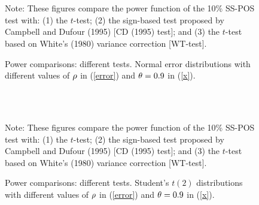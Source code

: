 \documentclass[harvard,11pt]{article}
\begin{document}
\begin{figure}[tbph]
\caption{Power comparisons: different tests. Normal error distributions with
different values of $\protect\rho $ in (\protect\ref{error}) and $\protect%
\theta =0.9$ in (\protect\ref{x}).}
\begin{center}
 \\[0pt]
\\[0pt]
\end{center}

Note: These figures compare the power
function of the 10\% SS-POS test with: (1) the $t$-test; (2) the sign-based test
proposed by Campbell and Dufour (1995) [CD (1995) test]; and (3) the $t$-test based
on White's (1980) variance correction [WT-test]. 
\label{fig: Power comparison using different tests NormalC1}
\end{figure}


\begin{figure}[tbph]
\caption{Power comparisons: different tests. Student's $t(2)$ distributions with
different values of $\protect\rho $ in (\protect\ref{error}) and $\protect%
\theta =0.9$ in (\protect\ref{x}).}
\begin{center}
 \\[0pt]
\\[0pt]
\end{center}

Note: These figures compare the power
function of the 10\% SS-POS test with: (1) the $t$-test; (2) the sign-based test
proposed by Campbell and Dufour (1995) [CD (1995) test]; and (3) the $t$-test based
on White's (1980) variance correction [WT-test]. 
\label{fig: Power comparaison using different tests CauchyC1}
\end{figure}
\end{document}
